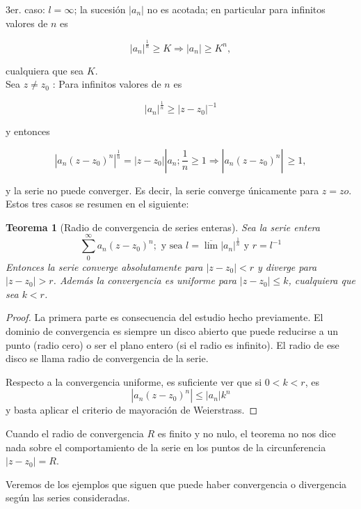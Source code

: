 \documentclass[10pt]{article}
\theoremstyle{plain}
\newtheorem{theorem}{Teorema}[section]
\theoremstyle{definition}
\theoremstyle{remark}
\begin{document}
3er. caso: $l=\infty$; la sucesión $\left|a_{n}\right|$ no es acotada; en particular para infinitos valores de $n$ es

$$
\left|a_{n}\right|^{\frac{1}{n}} \geqslant K \Rightarrow\left|a_{n}\right| \geqslant K^{n},
$$

cualquiera que sea $K$.\\
Sea $z \neq z_{0}$ : Para infinitos valores de $n$ es

$$
\left|a_{n}\right|^{\frac{1}{n}} \geqslant\left|z-z_{0}\right|^{-1}
$$

y entonces

$$
\left.\left|a_{n}\left(z-z_{0}\right)^{n}\right|^{\frac{1}{n}}=\left|z-z_{0}\right|\left|a_{n} ; \frac{1}{n} \geqslant 1 \Rightarrow\right| a_{n}\left(z-z_{0}\right)^{n} \right\rvert\, \geqslant 1,
$$

y la serie no puede converger.
Es decir, la serie converge únicamente para $z=z o$.
Estos tres casos se resumen en el siguiente:

\begin{theorem}[Radio de convergencia de series enteras]
Sea la serie entera
$$\sum_{0}^{\infty} a_{n}\left(z-z_{0}\right)^{n} ; \text{ y sea } l=\overline{\lim }\left|a_{n}\right|^{\frac{1}{n}} \text{ y } r=l^{-1}$$
Entonces la serie converge absolutamente para $\left|z-z_{0}\right|<r$ y diverge para $\left|z-z_{0}\right|>r$. Además la convergencia es uniforme para $\left|z-z_{0}\right| \leq k$, cualquiera que sea $k<r$.
\end{theorem}

\begin{proof}
La primera parte es consecuencia del estudio hecho previamente. El dominio de convergencia es siempre un disco abierto que puede reducirse a un punto (radio cero) o ser el plano entero (si el radio es infinito). El radio de ese disco se llama radio de convergencia de la serie.

Respecto a la convergencia uniforme, es suficiente ver que si $0<k<r$, es
$$\left|a_{n}\left(z-z_{0}\right)^{n}\right| \leq\left|a_{n}\right| k^{n}$$
y basta aplicar el criterio de mayoración de Weierstrass.
\end{proof}

Cuando el radio de convergencia $R$ es finito y no nulo, el teorema no nos dice nada sobre el comportamiento de la serie en los puntos de la circunferencia $\left|z-z_{0}\right|=R$.

Veremos de los ejemplos que siguen que puede haber convergencia o divergencia según las series consideradas.
\end{document}
